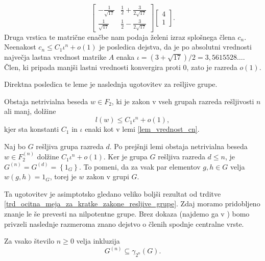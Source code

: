 \begin{dokaz}
\begin{equation*}
    \begin{bmatrix}
        - \frac{1}{\sqrt{17} } & \frac{1}{2} + \frac{3}{2 \sqrt{17} }\\
        \frac{1}{\sqrt{17} } & \frac{1}{2} - \frac{3}{2 \sqrt{17} }
    \end{bmatrix}
    \begin{bmatrix}
        4 \\
        1 
    \end{bmatrix}.
    \end{equation*}  
     Druga vrstica te matrične enačbe nam podaja želeni izraz splošnega člena $c_n$. Neenakost $c_n \le C_1 \iota^n + o(1)$ je posledica dejstva, 
     da je po absolutni vrednosti največja lastna vrednost matrike $A$ enaka $\iota = (3 + \sqrt{17})  / 2 = 3{,}5615528 \ldots$. Člen, ki pripada manjši lastni vrednosti konvergira proti $0$, zato je razreda $o(1)$.
\end{dokaz} 

Direktna posledica te leme je naslednja ugotovitev za rešljive grupe.

\begin{trditev}
\label{trd_osnovna_ocena_resljive_grupe} 
 Obstaja netrivialna beseda $w \in F_2$, ki je zakon v vseh grupah razreda rešljivosti $n$ ali manj, dolžine \begin{equation*}
 l(w) \le C_1 \iota^{n} + o(1),
 \end{equation*}  
 kjer sta konstanti $C_1$ in $\iota$ enaki kot v lemi \ref{lem_vrednost_cn}.  
\end{trditev}
\begin{dokaz}
    Naj bo $G$ rešljiva grupa razreda $d$. Po prejšnji lemi obstaja netrivialna beseda $w \in F_2^{(n)}$ dolžine $C_1 \iota^{n} +o(1)$. 
    Ker je grupa $G$ rešljiva razreda $d \le n$, je $G^{(n)} = G^{(d)} = \left\{  1_G \right\}$. To pomeni, da za vsak par elementov $g, h \in G$ velja
    $w(g, h) = 1_G$, torej je $w$ zakon v grupi $G$. 
\end{dokaz}

Ta ugotovitev je asimptotsko gledano veliko boljši rezultat od trditve \ref{trd_ocitna_meja_za_kratke_zakone_resljive_grupe}.
Zdaj moramo pridobljeno znanje le še prevesti na nilpotentne grupe. Brez dokaza (najdemo ga v \cite[str.~17--18]{Schneider_2016}) bomo privzeli naslednje razmeroma znano dejstvo o členih
spodnje centralne vrste. 

\begin{lema}
\label{lem_povezava_med_spodnjo_in_izpeljano_vrsto}
Za vsako število $n \ge 0$ velja inkluzija
\begin{equation*}
G^{(n)} \subseteq \gamma_{2^{n}}(G).
\end{equation*}    
\end{lema}

